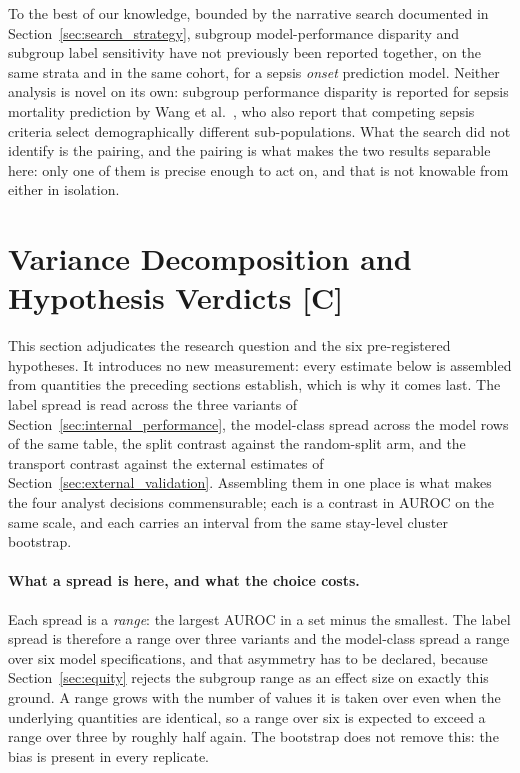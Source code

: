 To the best of our knowledge, bounded by the narrative search documented in
Section~\ref{sec:search_strategy}, subgroup model-performance disparity and
subgroup label sensitivity have not previously been reported together, on the
same strata and in the same cohort, for a sepsis \emph{onset} prediction model.
Neither analysis is novel on its own: subgroup performance disparity is
reported for sepsis mortality prediction by Wang et al.\
\cite{wang2022equity}, who also report that competing sepsis criteria select
demographically different sub-populations. What the search did not identify is
the pairing, and the pairing is what makes the two results separable here: only
one of them is precise enough to act on, and that is not knowable from either
in isolation.



\section{Variance Decomposition and Hypothesis Verdicts \texorpdfstring{[C]}{[C]}}
\label{sec:decomposition}

This section adjudicates the research question and the six pre-registered
hypotheses. It introduces no new measurement: every estimate below is assembled
from quantities the preceding sections establish, which is why it comes last.
The label spread is read across the three variants of
Section~\ref{sec:internal_performance}, the model-class spread across the model
rows of the same table, the split contrast against the random-split arm, and
the transport contrast against the external estimates of
Section~\ref{sec:external_validation}. Assembling them in one place is what
makes the four analyst decisions commensurable; each is a contrast in AUROC on
the same scale, and each carries an interval from the same stay-level cluster
bootstrap.

\paragraph{What a spread is here, and what the choice costs.} Each spread is a
\emph{range}: the largest AUROC in a set minus the smallest. The label spread is
therefore a range over three variants and the model-class spread a range over
six model specifications, and that asymmetry has to be declared, because
Section~\ref{sec:equity} rejects the subgroup range as an effect size on exactly
this ground. A range grows with the number of values it is taken over even when
the underlying quantities are identical, so a range over six is expected to
exceed a range over three by roughly half again. The bootstrap does not remove
this: the bias is present in every replicate.

